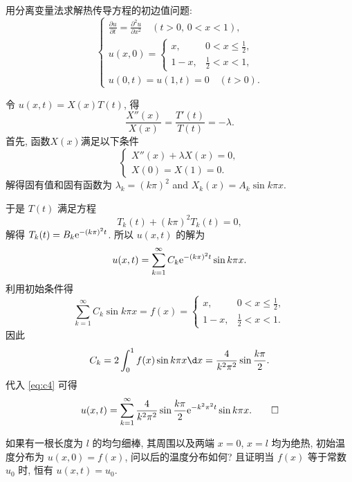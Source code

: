 \begin{exercise}
  用分离变量法求解热传导方程的初边值问题:
  \[\begin{cases}
    \displaystyle \frac{\partial u}{\partial t} = \frac{\partial^2 u}{\partial x^2} \quad (t>0,\, 0<x<1), \\
    u(x,0) = \begin{cases}
               x,     & 0 < x \leq\frac12, \\
               1 - x, & \frac12 < x < 1,
             \end{cases} \\
    u(0,t) = u(1,t) = 0 \quad (t>0).
  \end{cases}\]
\end{exercise}

\begin{solution}
  令 $u(x,t) = X(x)T(t)$, 得
  \[ \frac{X''(x)}{X(x)} = \frac{T'(t)}{T(t)} = -\lambda. \]
  首先, 函数$X(x)$满足以下条件
  \begin{equation}\label{eq:c3}
    \begin{cases}
      X''(x) + \lambda X(x) = 0, \\
      X(0) = X(1) = 0.
    \end{cases}
  \end{equation}
  解得固有值和固有函数为 $\lambda_k = (k\pi)^2$ and $X_k(x) = A_k\sin k\pi x$.

  于是 $T(t)$ 满足方程
  \[ T_k(t) + (k\pi)^2T_k(t) = 0, \]
  解得 $T_k(t) = B_k \mathrm{e}^{-(k\pi)^2t}$. 所以 $u(x,t)$ 的解为
  \begin{equation}\label{eq:c4}
    u(x,t) = \sum_{k=1}^\infty C_k \mathrm{e}^{-(k\pi)^2t} \sin k\pi x.
  \end{equation}
  利用初始条件得
  \[ \sum_{k=1}^\infty C_k \sin k\pi x = f(x) = \begin{cases}
    x,     & 0 < x \leq\frac12, \\
    1 - x, & \frac12 < x < 1.
  \end{cases} \]
  因此
  \begin{equation}\label{eq:c5}
    C_k = 2 \int_0^1 f(x) \sin k\pi x \d x = \frac{4}{k^2\pi^2} \sin\frac{k\pi}{2}.
  \end{equation}
  代入 \eqref{eq:c4} 可得
  \[ u(x,t) = \sum_{k=1}^\infty \frac{4}{k^2\pi^2} \sin\frac{k\pi}{2}
  \mathrm{e}^{-k^2\pi^2t} \sin k\pi x. \qedhere \]
\end{solution}


\begin{exercise}
  如果有一根长度为 $l$ 的均匀细棒, 其周围以及两端 $x=0$, $x=l$
  均为绝热, 初始温度分布为 $u(x,0)=f(x)$, 问以后的温度分布如何?
  且证明当 $f(x)$ 等于常数 $u_0$ 时, 恒有 $u(x,t)=u_0$.
\end{exercise}

